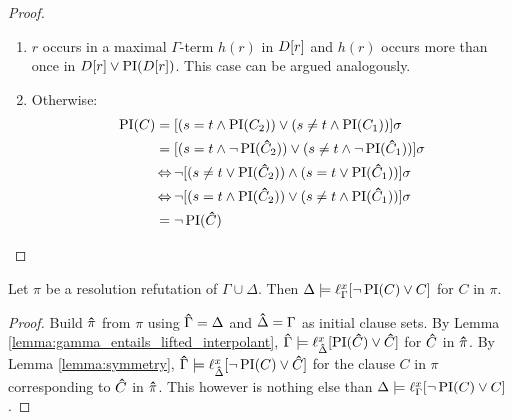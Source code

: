 \begin{proof}
\begin{itemize}
\begin{enumerate}
				\item $r$ occurs in a maximal $\Gamma$-term $h(r)$ in $D[r]$ and $h(r)$ occurs more than once in $D[r] \lor \operatorname{PI}(D[r])$.
					This case can be argued analogously.
				\item Otherwise:
					\begin{align*}
						\operatorname{PI}(C) &= [ ( s=t \land \operatorname{PI}(C_2) ) \lor (s\neq t \land \operatorname{PI}(C_1)) ]\sigma \\
									 &= [ ( s=t \land \lnot \operatorname{PI}(\bm\hat{C}_2) ) \lor (s\neq t \land \lnot \operatorname{PI}(\bm\hat{C}_1)) ]\sigma \\
									 &\operatorname{\Leftrightarrow} \lnot [ ( s\neq t \lor \operatorname{PI}(\bm\hat{C}_2) ) \land (s=t \lor \operatorname{PI}(\bm\hat{C}_1)) ]\sigma \\
									 &\operatorname{\Leftrightarrow} \lnot [ ( s=t \land \operatorname{PI}(\bm\hat{C}_2) ) \lor (s\neq t \land \operatorname{PI}(\bm\hat{C}_1)) ]\sigma \\
									 &= \lnot \operatorname{PI}(\bm\hat{C})
					\qedhere
					\end{align*}
			\end{enumerate}


	\end{itemize}

\end{proof}

\begin{cor}
	\label{cor:delta_entails_lifted_interpolant}
	Let $\pi$ be a resolution refutation of $\Gamma \cup \Delta$. 
	Then $\Delta \models \ell_{\Gamma}^{x}[ \lnot \operatorname{PI}(C) \lor C ]$ for $C$ in $\pi$.
\end{cor}
\begin{proof}
	Build $\bm\hat{\pi}$ from $\pi$ using $\bm\hat{\Gamma} = \Delta$ and $\bm\hat{\Delta} = \Gamma$ as initial clause sets.
	By Lemma \ref{lemma:gamma_entails_lifted_interpolant}, $\bm\hat{\Gamma} \models \ell_{\bm\hat{\Delta}}^{x}[ \operatorname{PI}(\bm\hat{C}) \lor \bm\hat{C} ]$ for $\bm\hat{C}$ in $\bm\hat{\pi}$. 
	By Lemma \ref{lemma:symmetry},
$\bm\hat{\Gamma} \models \ell_{\bm\hat{\Delta}}^{x}[ \lnot \operatorname{PI}(C) \lor \bm\hat{C} ]$ for the clause $C$ in $\pi$ corresponding to $\bm\hat{C}$ in $\bm\hat{\pi}$. 
	This however is nothing else than 
$\Delta \entails\nolinebreak \lft{\Gamma}{x}{ \lnot \PI(C) \lor C }$.
\end{proof}

